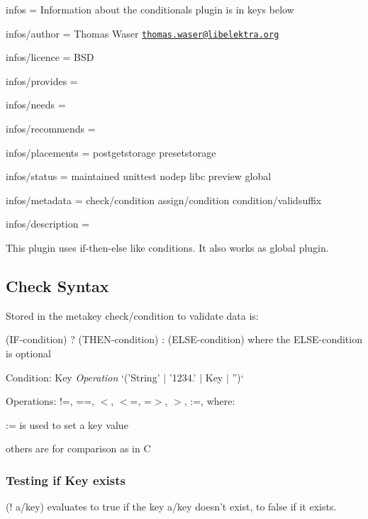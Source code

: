 
\begin{DoxyItemize}
\item infos = Information about the conditionals plugin is in keys below
\item infos/author = Thomas Waser \href{mailto:thomas.waser@libelektra.org}{\tt thomas.\+waser@libelektra.\+org}
\item infos/licence = B\+S\+D
\item infos/provides =
\item infos/needs =
\item infos/recommends =
\item infos/placements = postgetstorage presetstorage
\item infos/status = maintained unittest nodep libc preview global
\item infos/metadata = check/condition assign/condition condition/validsuffix
\item infos/description =
\end{DoxyItemize}

This plugin uses if-\/then-\/else like conditions. It also works as global plugin.

\subsection*{Check Syntax}

Stored in the metakey {\ttfamily check/condition} to validate data is\+:

{\ttfamily (I\+F-\/condition) ? (T\+H\+E\+N-\/condition) \+: (E\+L\+S\+E-\/condition)} where the E\+L\+S\+E-\/condition is optional

Condition\+: {\ttfamily Key} {\itshape Operation} `('String' $\vert$ '1234.' $\vert$ Key $\vert$ '')`

Operations\+: {\ttfamily !=, ==, $<$, $<$=, =$>$, $>$, \+:=}, where\+:


\begin{DoxyItemize}
\item {\ttfamily \+:=} is used to set a key value
\item others are for comparison as in C
\end{DoxyItemize}

\subsubsection*{Testing if Key exists}

{\ttfamily (! a/key)} evaluates to true if the key {\ttfamily a/key} doesn't exist, to false if it exists.

